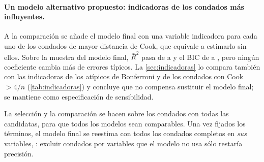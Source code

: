 \paragraph{Un modelo alternativo propuesto: indicadoras de los condados más influyentes.} A la
comparación se añade el modelo final con una variable indicadora para cada uno de los
 condados de mayor distancia de Cook, que equivale a estimarlo sin ellos. Sobre la
muestra del modelo final, $\bar R^2$ pasa de  a  y el BIC de
 a , pero ningún coeficiente cambia más de 
errores típicos. La \cref{sec:indicadoras} lo compara también con las indicadoras de los atípicos
de Bonferroni y de los  condados con Cook $>4/n$ (\cref{tab:indicadoras}) y
concluye que no compensa sustituir el modelo final; se mantiene como especificación de
sensibilidad.

\begin{idea}
La selección y la comparación se hacen sobre los  condados con todas las candidatas,
para que todos los modelos sean comparables. Una vez fijados los términos, el modelo final se
reestima con todos los condados completos en \emph{sus} variables, : excluir
condados por variables que el modelo no usa sólo restaría precisión.
\end{idea}
